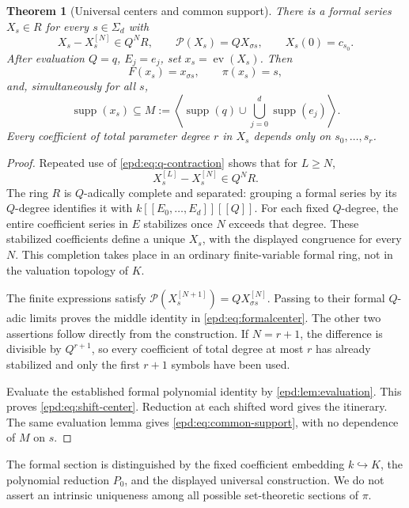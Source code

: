 \documentclass[11pt,a4paper]{article}
\numberwithin{equation}{section}
\newtheorem{theorem}{Theorem}[section]
\theoremstyle{plain}
\theoremstyle{definition}
\theoremstyle{remark}
\newcommand{\Sig}{\Sigma_d}
\newcommand{\sh}{\sigma}
\newcommand{\supp}{\operatorname{supp}}
\newcommand{\ev}{\operatorname{ev}}
\begin{document}
\begin{theorem}[Universal centers and common support]\label{epd:thm:centers}
There is a formal series $X_s\in R$ for every $s\in\Sig$ with
\begin{equation}\label{epd:eq:formalcenter}
 X_s-X_s^{[N]}\in Q^N R,
 \qquad \mathcal P(X_s)=QX_{\sh s},
 \qquad X_s(0)=c_{s_0}.
\end{equation}
After evaluation $Q=q$, $E_j=e_j$, set $x_s=\ev(X_s)$. Then
\begin{equation}\label{epd:eq:shift-center}
 F(x_s)=x_{\sh s},\qquad \pi(x_s)=s,
\end{equation}
and, simultaneously for all $s$,
\begin{equation}\label{epd:eq:common-support}
 \supp(x_s)\subseteq
 M:=\left\langle\supp(q)\cup\bigcup_{j=0}^d\supp(e_j)\right\rangle.
\end{equation}
Every coefficient of total parameter degree $r$ in $X_s$ depends only
on $s_0,\ldots,s_r$.
\end{theorem}
\begin{proof}
Repeated use of \eqref{epd:eq:q-contraction} shows that for $L\geq N$,
\[
 X_s^{[L]}-X_s^{[N]}\in Q^N R.
\]
The ring $R$ is $Q$-adically complete and separated: grouping a formal
series by its $Q$-degree identifies it with
$k[[E_0,\ldots,E_d]][[Q]]$. For each fixed $Q$-degree, the entire
coefficient series in $E$ stabilizes once $N$ exceeds that degree.
These stabilized coefficients define a unique $X_s$, with the displayed
congruence for every $N$.
This completion takes place in an ordinary finite-variable formal
ring, not in the valuation topology of $K$.

The finite expressions satisfy
$\mathcal P(X_s^{[N+1]})=QX_{\sh s}^{[N]}$. Passing to their formal
$Q$-adic limits proves the middle identity in
\eqref{epd:eq:formalcenter}. The other two assertions follow directly from
the construction. If $N=r+1$, the difference is divisible by $Q^{r+1}$,
so every coefficient of total degree at most $r$ has already stabilized
and only the first $r+1$ symbols have been used.

Evaluate the established formal polynomial identity by
\cref{epd:lem:evaluation}. This proves \eqref{epd:eq:shift-center}. Reduction
at each shifted word gives the itinerary. The same evaluation lemma
gives \eqref{epd:eq:common-support}, with no dependence of $M$ on $s$.
\end{proof}

The formal section is distinguished by the fixed coefficient embedding
$k\hookrightarrow K$, the polynomial reduction $P_0$, and the displayed
universal construction. We do not assert an intrinsic uniqueness among
all possible set-theoretic sections of $\pi$.
\end{document}
